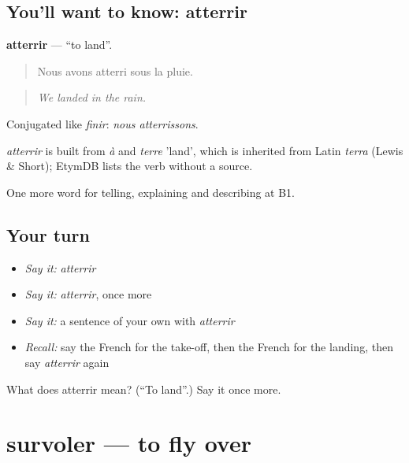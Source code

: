 \subsection*{You'll want to know: atterrir}
\textbf{atterrir} — \textquotedblleft{}to land\textquotedblright{}.

\begin{quote}
Nous avons atterri sous la pluie.
\end{quote}

\begin{quote}
\emph{We landed in the rain.}
\end{quote}

Conjugated like \emph{finir}: \emph{nous atterrissons}.

\begin{cousinweb}
\emph{atterrir} is built from \emph{à} and \emph{terre} 'land', which is inherited from Latin \emph{terra} (Lewis \& Short); EtymDB lists the verb without a source.
\end{cousinweb}

\begin{grammarlens}[title={What you've built}]
One more word for telling, explaining and describing at B1.
\end{grammarlens}

\subsection*{Your turn}
\begin{itemize}
\raggedright
  \item \emph{Say it:} \emph{atterrir}
  \item \emph{Say it:} \emph{atterrir}, once more
  \item \emph{Say it:} a sentence of your own with \emph{atterrir}
  \item \emph{Recall:} say the French for the take-off, then the French for the landing, then say \emph{atterrir} again
\end{itemize}

\begin{tcolorbox}[breakable,colback=teal!4,colframe=teal!35!black,title={Before you move on}]
What does atterrir mean? (\textquotedblleft{}To land\textquotedblright{}.) Say it once more.
\end{tcolorbox}
\section[survoler]{survoler — to fly over}

